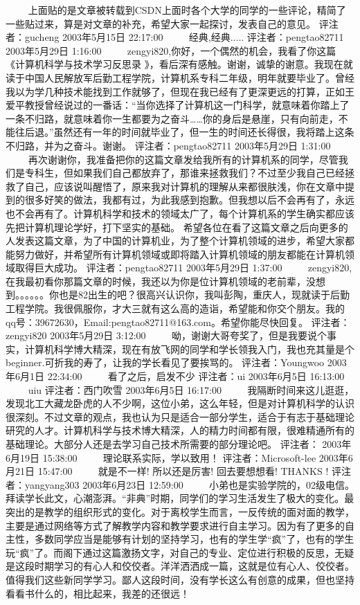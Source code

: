 　　 上面贴的是文章被转载到CSDN上面时各个大学的同学的一些评论，精简了一些贴过来，算是对文章的补充，希望大家一起探讨，发表自己的意见。
评注者：gucheng	2003年5月15日 22:17:00
　　 经典,经典.....
评注者：pengtao82711	2003年5月29日 1:16:00
　　 zengyi820,你好，一个偶然的机会，我看了你这篇《计算机科学与技术学习反思录 》，看后深有感触。谢谢，诚挚的谢意。我现在就读于中国人民解放军后勤工程学院，计算机系专科二年级，明年就要毕业了。曾经我以为学几种技术能找到工作就够了，但现在我已经有了更深更远的打算，正如王爱平教授曾经说过的一番话：“当你选择了计算机这一门科学，就意味着你踏上了一条不归路，就意味着你一生都要为之奋斗……你的身后是悬崖，只有向前走，不能往后退。”虽然还有一年的时间就毕业了，但一生的时间还长得很，我将踏上这条不归路，并为之奋斗。谢谢。
评注者：pengtao82711	2003年5月29日 1:31:00
　　 再次谢谢你，我准备把你的这篇文章发给我所有的计算机系的同学，尽管我们是专科生，但如果我们自己都放弃了，那谁来拯救我们？不过至少我自己已经拯救了自己，应该说叫醒悟了，原来我对计算机的理解从来都很肤浅，你在文章中提到的很多好笑的做法，我都有过，为此我感到抱歉。但我想以后不会再有了，永远也不会再有了。计算机科学和技术的领域太广了，每个计算机系的学生确实都应该先把计算机理论学好，打下坚实的基础。
希望各位在看了这篇文章之后向更多的人发表这篇文章，为了中国的计算机业，为了整个计算机领域的进步，希望大家都能努力做好，并希望所有计算机领域或即将踏入计算机领域的朋友都能在计算机领域取得巨大成功。
评注者：pengtao82711	2003年5月29日 1:37:00
　　 zengyi820,在我最初看你那篇文章的时候，我还以为你是位计算机领域的老前辈，没想到。。。。。。你也是82出生的吧？很高兴认识你，我叫彭陶，重庆人，现就读于后勤工程学院。我很佩服你，才大三就有这么高的造诣，希望能和你交个朋友。我的qq号：39672630，Email:pengtao82711@163.com。希望你能尽快回复。
评注者：zengyi820	2003年5月29日 3:12:00
　　 呦，谢谢大哥夸奖了，但是我要说个事实，计算机科学博大精深，现在有放飞网的同学和学长领我入门，我也充其量是个beginner.可折我的寿了，让我的学长看见了要挨骂的。
评注者：Youngwoo	2003年6月1日 22:34:00
　　 看了之后，启发不少
评注者：ui	2003年6月5日 16:13:00
　　 uiu
评注者：西门吹雪	2003年6月5日 16:17:00
　　 我隔断时间来这儿逛逛，发现北工大藏龙卧虎的人不少啊，这位小弟，这么年轻，但是对计算机科学的认识很深刻。不过文章的观点，我也认为只是适合一部分学生，适合于有志于基础理论研究的人才。计算机科学与技术博大精深，人的精力时间都有限，很难精通所有的基础理论。大部分人还是去学习自己技术所需要的部分理论吧。
评注者：	2003年6月19日 15:38:00
　　 理论联系实际，学以致用！
评注者：Microsoft-lee	2003年6月21日 15:47:00
　　 就是不一样!
所以还是厉害!
回去要想想看!
THANKS !
评注者：yangyang303	2003年6月23日 12:59:00
　　 小弟也是实验学院的，02级电信。拜读学长此文，心潮澎湃。“非典”时期，同学们的学习生活发生了极大的变化。最突出的是教学的组织形式的变化。对于离校学生而言，一反传统的面对面的教学，主要是通过网络等方式了解教学内容和教学要求进行自主学习。因为有了更多的自主性，多数同学应当是能够有计划的坚持学习，也有的学生学“疯”了，也有的学生玩“疯”了。而阁下通过这篇激扬文字，对自己的专业、定位进行积极的反思，无疑是这段时期学习的有心人和佼佼者。洋洋洒洒成一篇，这就是位有心人、佼佼者。值得我们这些新同学学习。鄙人这段时间，没有学长这么有创意的成果，但也坚持看看书什么的，相比起来，我差的还很远！


